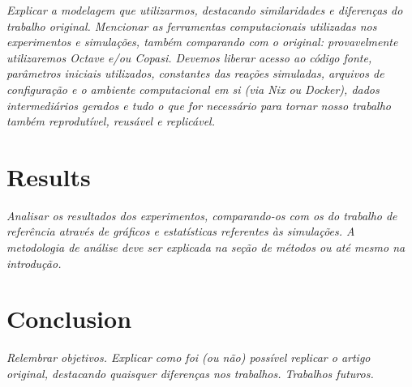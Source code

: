   \textit{Explicar a modelagem que utilizarmos, destacando similaridades e diferenças do trabalho original.
  Mencionar as ferramentas computacionais utilizadas nos experimentos e simulações, também comparando com o original: provavelmente utilizaremos \textit{Octave} e/ou \textit{Copasi}.
  Devemos liberar acesso ao código fonte, parâmetros iniciais utilizados, constantes das reações simuladas, arquivos de configuração e o ambiente computacional em si (via Nix ou Docker), dados intermediários gerados e tudo o que for necessário para tornar nosso trabalho também reprodutível, reusável e replicável.}


\section{Results}

  \textit{Analisar os resultados dos experimentos, comparando-os com os do trabalho de referência através de gráficos e estatísticas referentes às simulações.
  A metodologia de análise deve ser explicada na seção de métodos ou até mesmo na introdução.}


\section{Conclusion}


  \textit{Relembrar objetivos.
  Explicar como foi (ou não) possível replicar o artigo original, destacando quaisquer diferenças nos trabalhos.
  Trabalhos futuros.}
